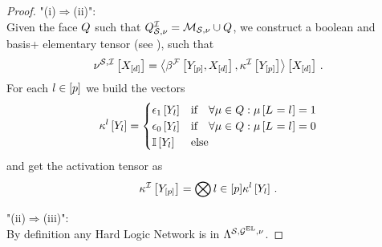 \begin{proof}
    "(i)$\Rightarrow$(ii)": \\
    Given the face $Q$ such that $Q^{\mathcal{I}}_{\mathcal{S},\nu}=\mathcal{M}_{\mathcal{S},\nu}\cup Q$, we construct a boolean and basis+ elementary tensor (see ), such that
    \begin{align*}
        \nu^{\mathcal{S},\mathcal{I}}\left[X_{[d]}\right]
        = \left\langle \beta^{\mathcal{F}}\left[Y_{[p]},X_{[d]}\right],\kappa^{\mathcal{I}}\left[Y_{[p]}\right]\right\rangle \left[ X_{[d]} \right] \, .
    \end{align*}
    For each $l\in[p]$ we build the vectors
    \begin{align*}
        \kappa^{l}\left[Y_{l}\right]
        = \begin{cases}
              \epsilon_1\left[Y_{l}\right] & \text{if} \quad \forall{\mu\in Q}:{\mu\left[L_{}=l_{}\right]=1} \\
              \epsilon_0\left[Y_{l}\right] & \text{if} \quad \forall{\mu\in Q}:{\mu\left[L_{}=l_{}\right]=0} \\
              \mathbb{I}\left[Y_{l}\right] & \text{else}
        \end{cases}
    \end{align*}
    and get the activation tensor as
    \begin{align*}
        \kappa^{\mathcal{I}}\left[Y_{[p]}\right]
        = \bigotimes{l\in[p]} \kappa^{l}\left[Y_{l}\right] \, .
    \end{align*}

    "(ii)$\Rightarrow$(iii)": \\
    By definition any Hard Logic Network is in $\Lambda^{\mathcal{S},\mathcal{G}^{\mathrm{EL}},\nu}$.


\end{proof}
